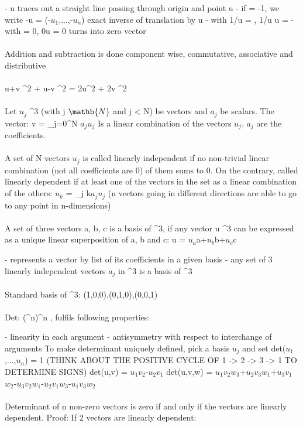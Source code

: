 \documentclass{article}
\begin{document}
- \lambda u\) traces out a straight line passing through origin and point u
- if \lambda = -1\), we write \math -u = (-$u_1$,...,-$u_n$)\) exact inverse of translation by u
- with 1/\vert u \vert = \lambda, 1/\vert u \vert u = \)
- with \lambda = 0, 0u = 0\) turns into zero vector
\\
\\
Addition and subtraction is done component wise, commutative, associative and distributive
\\
\\
\vert u+v \vert^2 + \vert u-v \vert^2 = 2\vert u\vert^2 + 2\vert v \vert^2\)
\\
\\
Let $u_j$ \in \Re^3\) (with \math j \in $\mathb{N}$\) and \math j < N\)) be vectors and $a_j$ be scalars. The vector:
\newline \math v = \sum_{j=0}^{N} $a_j$$u_j$ \)
\newline Is a linear combination of the vectors $u_j$. $a_j$ are the coefficients.
\\
\\
A set of N vectors {$u_j$} is called linearly independent if no non-trivial linear combination (not all coefficients are 0) of them sums to 0. On the contrary, called linearly dependent if at least one of the vectors in the set as a linear combination of the others: \math $u_k$ = \sum_{j \neq k}$a_j$$u_j$\) (n vectors going in different directions are able to go to any point in n-dimensions)
\\
\\
A set of three vectors a, b, c is a basis of \Re^3\), if any vector \math u \in \Re^3\) can be expressed as a unique linear superposition of a, b and c:
\newline \math u = $u_a$a+$u_b$b+$u_c$c\)

- represents a vector by list of its coefficients in a given basis
- any set of 3 linearly independent vectors $a_j$ in \Re^3\) is a basis of \Re^3\)
\\
\\
Standard basis of \Re^3: (1,0,0),(0,1,0),(0,0,1)   \)
\\
\\
Det: (\Re^n\))^n \rightarrow \Re\), fulfils following properties:

- linearity in each argument
- antisymmetry with respect to interchange of arguments
\newline To make determinant uniquely defined, pick a basis {$u_j$} and set det($u_1$,...,$u_n$) = 1
\newline (THINK ABOUT THE POSITIVE CYCLE OF 1 -> 2 -> 3 -> 1 TO DETERMINE SIGNS)
\newline \math det(u,v) = $u_1$$v_2$-$u_2$$v_1$
\newline det(u,v,w) = $u_1$$v_2$$w_3$+$u_2$$v_3$$w_1$+$u_3$$v_1$$w_2$-$u_3$$v_2$$w_1$-$u_2$$v_1$$w_3$-$u_1$$v_3$$w_2$\)
\\
\\
Determinant of n non-zero vectors is zero if and only if the vectors are linearly dependent. Proof:
\newline If 2 vectors are linearly dependent:
\end{document}
